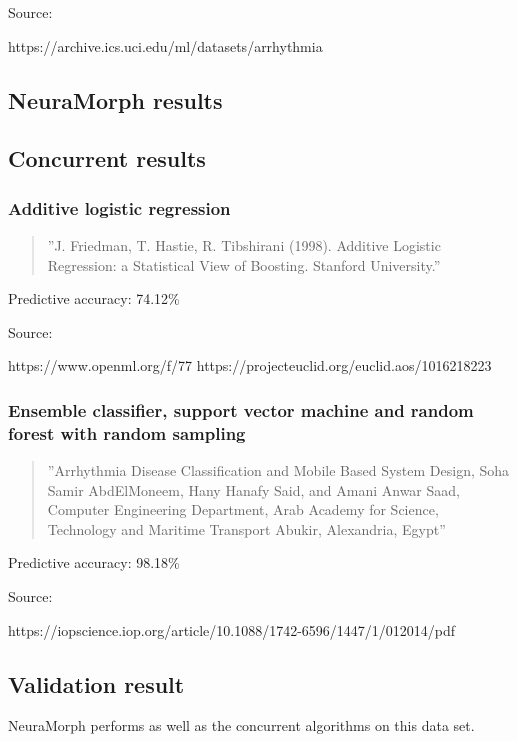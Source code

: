 \documentclass[8pt, a4paper]{article}
\begin{document}
Source: 

https://archive.ics.uci.edu/ml/datasets/arrhythmia

\subsection{NeuraMorph results}

%

\subsection{Concurrent results}

\subsubsection{Additive logistic regression}

\begin{quote}
''J. Friedman, T. Hastie, R. Tibshirani (1998). Additive Logistic Regression: a Statistical View of Boosting. Stanford University.''
\end{quote}

Predictive accuracy: 74.12\%

Source:

https://www.openml.org/f/77
https://projecteuclid.org/euclid.aos/1016218223

\subsubsection{Ensemble classifier, support vector machine and random forest with random sampling}

\begin{quote}
''Arrhythmia Disease Classification and Mobile Based System
Design, Soha Samir AbdElMoneem, Hany Hanafy Said, and Amani Anwar Saad, Computer Engineering Department, Arab Academy for Science, Technology and
Maritime Transport Abukir, Alexandria, Egypt''
\end{quote}

Predictive accuracy: 98.18\%

Source:

https://iopscience.iop.org/article/10.1088/1742-6596/1447/1/012014/pdf

\subsection{Validation result}

NeuraMorph performs as well as the concurrent algorithms on this data set.
\end{document}
